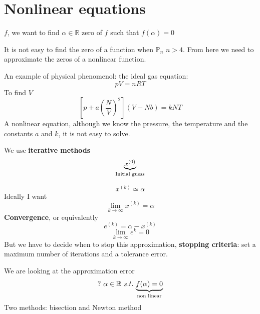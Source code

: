 
\section{Nonlinear equations}

$f$, we want to find $\alpha\in\mathbb{R}$ zero of $f$ such that $f(\alpha)=0$

It is not easy to find the zero of a function when
$\mathbb{P}_n\,\,n>4$. From here we need to approximate the zeros of a nonlinear function.

An example of physical phenomenol: the ideal gas equation:
$$pV=nRT$$
To find $V$
$$\left[
    p+a\left(
        \frac{N}{V}
    \right)^2
\right](V-Nb)=kNT$$
A nonlinear equation, although we know the pressure, the temperature and the constants $a$ and $k$, it is not easy to solve.

We use \textbf{iterative methods}
$$\underlabel{x^{(0)}}{Initial guess}$$

\begin{figure}[!ht]
    \begin{minipage}{\linewidth}
        \centering
    \end{minipage}
\end{figure}

$$x^{(k)}\simeq\alpha$$
Ideally I want
$$\lim_{k\rightarrow\infty}x^{(k)}=\alpha$$
\textbf{Convergence}, or equivalently
$$e^{(k)}=\alpha-x^{(k)}$$
$$\lim_{k\rightarrow\infty}e^{k}=0$$
But we have to decide when to stop this approximation, \textbf{stopping criteria}: set a maximum number of iterations and a tolerance error.

We are looking at the approximation error
$$?\,\,\alpha\in\mathbb{R}\,\,s.t.\,\,\underlabel{f(\alpha)=0}{non linear}$$
Two methods: bisection and Newton method

